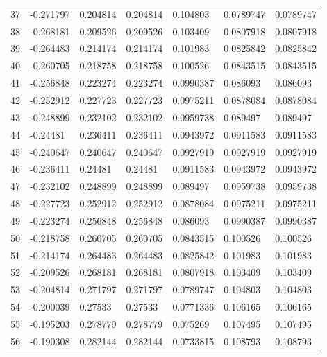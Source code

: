 \begin{longtable}{l|lll|lll}
  37 & -0.271797    & 0.204814    & 0.204814    &  0.104803    & 0.0789747   & 0.0789747   \\
  38 & -0.268181    & 0.209526    & 0.209526    &  0.103409    & 0.0807918   & 0.0807918   \\
  39 & -0.264483    & 0.214174    & 0.214174    &  0.101983    & 0.0825842   & 0.0825842   \\
  40 & -0.260705    & 0.218758    & 0.218758    &  0.100526    & 0.0843515   & 0.0843515   \\
  41 & -0.256848    & 0.223274    & 0.223274    &  0.0990387   & 0.086093    & 0.086093    \\
  42 & -0.252912    & 0.227723    & 0.227723    &  0.0975211   & 0.0878084   & 0.0878084   \\
  43 & -0.248899    & 0.232102    & 0.232102    &  0.0959738   & 0.089497    & 0.089497    \\
  44 & -0.24481     & 0.236411    & 0.236411    &  0.0943972   & 0.0911583   & 0.0911583   \\
  45 & -0.240647    & 0.240647    & 0.240647    &  0.0927919   & 0.0927919   & 0.0927919   \\
  46 & -0.236411    & 0.24481     & 0.24481     &  0.0911583   & 0.0943972   & 0.0943972   \\
  47 & -0.232102    & 0.248899    & 0.248899    &  0.089497    & 0.0959738   & 0.0959738   \\
  48 & -0.227723    & 0.252912    & 0.252912    &  0.0878084   & 0.0975211   & 0.0975211   \\
  49 & -0.223274    & 0.256848    & 0.256848    &  0.086093    & 0.0990387   & 0.0990387   \\
  50 & -0.218758    & 0.260705    & 0.260705    &  0.0843515   & 0.100526    & 0.100526    \\
  51 & -0.214174    & 0.264483    & 0.264483    &  0.0825842   & 0.101983    & 0.101983    \\
  52 & -0.209526    & 0.268181    & 0.268181    &  0.0807918   & 0.103409    & 0.103409    \\
  53 & -0.204814    & 0.271797    & 0.271797    &  0.0789747   & 0.104803    & 0.104803    \\
  54 & -0.200039    & 0.27533     & 0.27533     &  0.0771336   & 0.106165    & 0.106165    \\
  55 & -0.195203    & 0.278779    & 0.278779    &  0.075269    & 0.107495    & 0.107495    \\
  56 & -0.190308    & 0.282144    & 0.282144    &  0.0733815   & 0.108793    & 0.108793    \\

\end{longtable}
